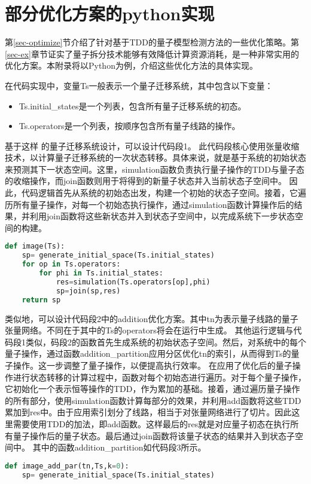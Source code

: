 \thispagestyle{appendixheader}
\setcounter{app_fig}{1}
\setcounter{app_tab}{1}
\setcounter{equation}{0}
\renewcommand\theequation{附\arabic{app}-\arabic{equation}}
\renewcommand\chaptername{附录}
\renewcommand\chaptername{Appendix} 
\renewcommand\thechapter{附录\zhnum{app}} 

\setcounter{chapter}{0}
\setcounter{section}{0}
\chapter{部分优化方案的python实现}\label{chap:app1}{
第\ref{sec-optimize}节介绍了针对基于TDD的量子模型检测方法的一些优化策略。第\ref{sec-ex}章节证实了量子拆分技术能够有效降低计算资源消耗，是一种非常实用的优化方案。本附录将以Python为例，介绍这些优化方法的具体实现。

在代码实现中，变量Ts一般表示一个量子迁移系统，其中包含以下变量：
\begin{itemize}
    \item Ts.initial\_states是一个列表，包含所有量子迁移系统的初态。
    \item Ts.operators是一个列表，按顺序包含所有量子线路的操作。
\end{itemize}
基于这样 的量子迁移系统设计，可以设计代码段1。
此代码段核心使用张量收缩技术，以计算量子迁移系统的一次状态转移。具体来说，就是基于系统的初始状态来预测其下一状态空间。这里，simulation函数负责执行量子操作的TDD与量子态的收缩操作，而join函数则用于将得到的新量子状态并入当前状态子空间中。
因此，代码逻辑首先从系统的初始态出发，构建一个初始的状态子空间。接着，它遍历所有量子操作，对每一个初始态执行操作，通过simulation函数计算操作后的结果，并利用join函数将这些新状态并入到状态子空间中，以完成系统下一步状态空间的构建。
\begin{lstlisting}[language=Python, caption={利用TDD收缩直接计算一步迁移\label{code-image}}]
def image(Ts):
    sp= generate_initial_space(Ts.initial_states)
    for op in Ts.operators:
        for phi in Ts.initial_states:
            res=simulation(Ts.operators[op],phi)
            sp=join(sp,res)
    return sp
\end{lstlisting}

类似地，可以设计代码段2中的addition优化方案。其中tn为表示量子线路的量子张量网络。不同在于其中的Ts的operators将会在运行中生成。
其他运行逻辑与代码段1类似，码段2的函数首先生成系统的初始状态子空间。然后，对系统中的每个量子操作，通过函数addition\_partition应用分区优化tn的索引，从而得到Ts的量子操作。这一步调整了量子操作，以便提高执行效率。
在应用了优化后的量子操作进行状态转移的计算过程中，函数对每个初始态进行遍历。对于每个量子操作，它初始化一个表示恒等操作的TDD，作为累加的基础。接着，通过遍历量子操作的所有部分，使用simulation函数计算每部分的效果，并利用add函数将这些TDD累加到res中。由于应用索引划分了线路，相当于对张量网络进行了切片。因此这里需要使用TDD的加法，即add函数。这样最后的res就是对应量子初态在执行所有量子操作后的量子状态。最后通过join函数将该量子状态的结果并入到状态子空间中。
其中的函数addition\_partition如代码段3所示。
\begin{lstlisting}[language=Python, caption=对量子线路应用addition优化方案计算一步迁移]
def image_add_par(tn,Ts,k=0):
    sp= generate_initial_space(Ts.initial_states)


\end{lstlisting}}
